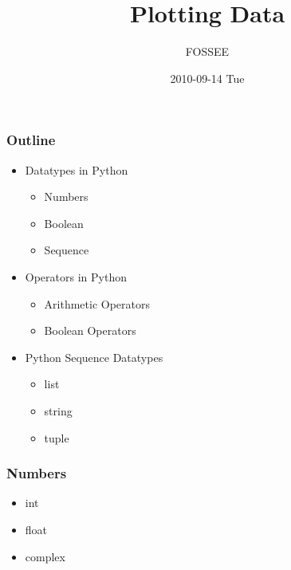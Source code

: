 \documentclass[presentation]{beamer}
\title{Plotting Data }
\author{FOSSEE}
\date{2010-09-14 Tue}
\begin{document}
\maketitle









\begin{frame}
\frametitle{Outline}
\label{sec-1}
\begin{itemize}

\item Datatypes in Python
\label{sec-1_1}%
\begin{itemize}

\item Numbers\\
\label{sec-1_1_1}%
\item Boolean\\
\label{sec-1_1_2}%
\item Sequence\\
\label{sec-1_1_3}%
\end{itemize} %

\item Operators in Python
\label{sec-1_2}%
\begin{itemize}

\item Arithmetic Operators\\
\label{sec-1_2_1}%
\item Boolean Operators\\
\label{sec-1_2_2}%
\end{itemize} %

\item Python Sequence Datatypes
\label{sec-1_3}%
\begin{itemize}

\item list\\
\label{sec-1_3_1}%
\item string\\
\label{sec-1_3_2}%
\item tuple\\
\label{sec-1_3_3}%
\end{itemize} %
\end{itemize} %
\end{frame}
\begin{frame}
\frametitle{Numbers}
\label{sec-2}

\begin{itemize}
\item int
\item float
\item complex
\end{itemize}
\end{frame}
\end{document}
